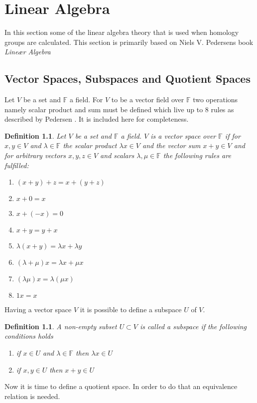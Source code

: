 \documentclass[11pt,a4paper,twoside]{report}
\newtheorem{mydef}[mythm]{Definition}
\begin{document}
\appendix
\chapter{Linear Algebra}
In this section some of the linear algebra theory that is used when homology groups are calculated. This section is primarily based on Niels V. Pedersens book \emph{Lineær Algebra}\cite{LinAlg}
\section{Vector Spaces, Subspaces and Quotient Spaces}
Let $V$ be a set and $\mathbb{F}$ a field. For $V$ to be a vector field over $\mathbb{F}$ two operations namely scalar product and sum must be defined which live up to 8 rules as described by Pedersen \cite[pp. 85-86]{LinAlg}. It is included here for completeness.
\begin{mydef} 
Let $V$ be a set and $\mathbb{F}$ a field. $V$ is a vector space over $\mathbb{F}$ if for $x,y\in V$ and $\lambda\in\mathbb{F}$ the scalar product $\lambda x\in V$ and the vector sum $x+y\in V$ and for arbitrary vectors $x,y,z\in V$ and scalars $\lambda,\mu\in\mathbb{F}$ the following rules are fulfilled:
\begin{enumerate}
\item $(x+y)+z = x+(y+z)$
\item $x+0=x$
\item $x+(-x)=0$
\item $x+y=y+x$
\item $\lambda(x+y)=\lambda x+\lambda y$
\item $(\lambda+\mu)x=\lambda x + \mu x$
\item $(\lambda\mu)x=\lambda(\mu x)$
\item $1x=x$
\end{enumerate}
\end{mydef}
Having a vector space $V$ it is possible to define a subspace $U$ of $V$.\cite[p.93]{LinAlg}
\begin{mydef}
A non-empty subset $U\subset V$ is called a subspace if the following conditions holds
\begin{enumerate}
\item if $x\in U$ and $\lambda\in\mathbb{F}$ then $\lambda x\in U$
\item if $x,y\in U$ then $x+y\in U$
\end{enumerate} 
\end{mydef}
Now it is time to define a quotient space. In order to do that an equivalence relation is needed. 
\end{document}
